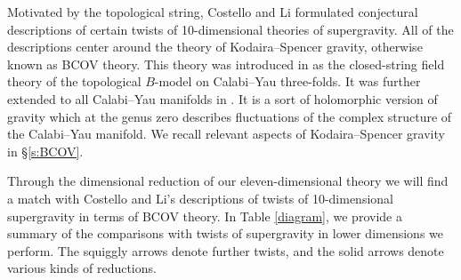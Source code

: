 Motivated by the topological string, Costello and Li formulated conjectural descriptions of certain twists of 10-dimensional theories of supergravity. 
All of the descriptions center around the theory of Kodaira--Spencer gravity, otherwise known as BCOV theory. 
This theory was introduced in \cite{BCOV} as the closed-string field theory of the topological $B$-model on Calabi--Yau three-folds.
It was further extended to all Calabi--Yau manifolds in \cite{CLbcov1}. 
It is a sort of holomorphic version of gravity which at the genus zero  describes fluctuations of the complex structure of the Calabi--Yau manifold. 
We recall relevant aspects of Kodaira--Spencer gravity in \S\ref{s:BCOV}. 

Through the dimensional reduction of our eleven-dimensional theory we will find a match with Costello and Li's descriptions of twists of 10-dimensional supergravity in terms of BCOV theory.
In Table \ref{diagram}, we provide a summary of the comparisons with twists of supergravity in lower dimensions we perform. The squiggly arrows denote further twists, and the solid arrows denote various kinds of reductions. 

